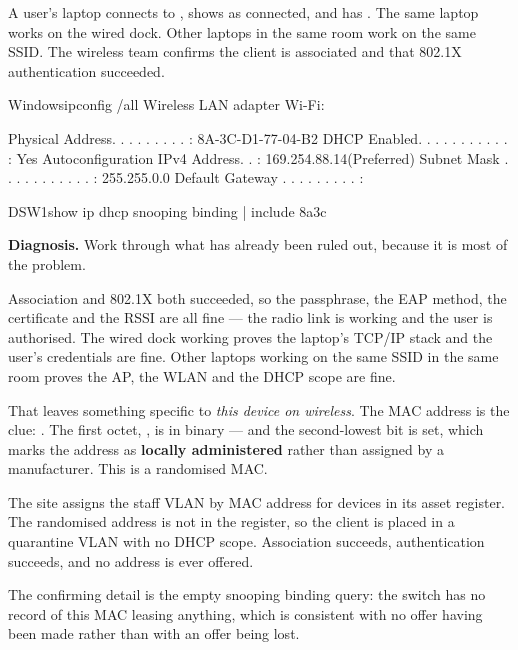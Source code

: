 \begin{breakfix}
A user's laptop connects to , shows as connected, and has
. The same laptop works on the wired dock. Other laptops in the
same room work on the same SSID. The wireless team confirms the client is
associated and that 802.1X authentication succeeded.

\begin{hostcmd}{Windows}{ipconfig /all}
Wireless LAN adapter Wi-Fi:

   Physical Address. . . . . . . . . : 8A-3C-D1-77-04-B2
   DHCP Enabled. . . . . . . . . . . : Yes
   Autoconfiguration IPv4 Address. . : 169.254.88.14(Preferred)
   Subnet Mask . . . . . . . . . . . : 255.255.0.0
   Default Gateway . . . . . . . . . :
\end{hostcmd}

\begin{verify}{DSW1}{show ip dhcp snooping binding | include 8a3c}
\end{verify}

\textbf{Diagnosis.} Work through what has already been ruled out, because it is
most of the problem.

Association and 802.1X both succeeded, so the passphrase, the EAP method, the
certificate and the RSSI are all fine --- the radio link is working and the user
is authorised. The wired dock working proves the laptop's TCP/IP stack and the
user's credentials are fine. Other laptops working on the same SSID in the same
room proves the AP, the WLAN and the DHCP scope are fine.

That leaves something specific to \emph{this device on wireless}. The MAC address
is the clue: . The first octet, , is
 in binary --- and the second-lowest bit is set, which marks the
address as \textbf{locally administered} rather than assigned by a manufacturer.
This is a randomised MAC.

The site assigns the staff VLAN by MAC address for devices in its asset register.
The randomised address is not in the register, so the client is placed in a
quarantine VLAN with no DHCP scope. Association succeeds, authentication
succeeds, and no address is ever offered.

The confirming detail is the empty snooping binding query: the switch has no
record of this MAC leasing anything, which is consistent with no offer having
been made rather than with an offer being lost.


\end{breakfix}
